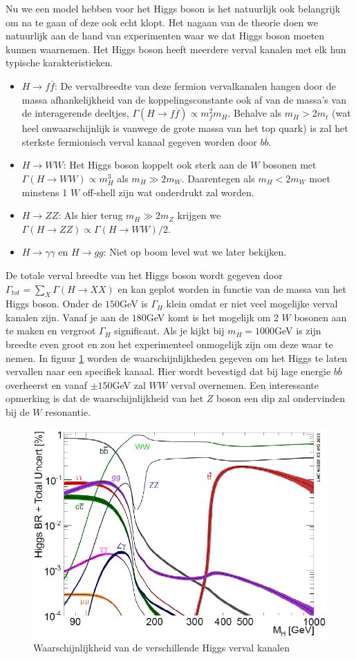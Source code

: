\documentclass[../main.tex]{subfiles}
\begin{document}
Nu we een model hebben voor het Higgs boson is het natuurlijk ook belangrijk om na te gaan of deze ook echt klopt. Het nagaan van de theorie doen we natuurlijk aan de hand van experimenten waar we dat Higgs boson moeten kunnen waarnemen. Het Higgs boson heeft meerdere verval kanalen met elk hun typische karakteristieken.
\begin{itemize}
    \item $H\rightarrow f\overline f$: De vervalbreedte van deze fermion vervalkanalen hangen door de massa afhankelijkheid van de koppelingsconstante ook af van de massa's van de interagerende deeltjes, $\Gamma(H\rightarrow f\overline f) \propto m_f^2m_H$. Behalve als $m_H > 2m_t$ (wat heel onwaarschijnlijk is vanwege de grote massa van het top quark) is zal het sterkste fermionisch verval kanaal gegeven worden door $b\overline b$.
    \item $H\rightarrow WW$: Het Higgs boson koppelt ook sterk aan de $W$ bosonen met $\Gamma(H\rightarrow WW)\propto m_H^3$ als $m_H \gg 2m_W$. Daarentegen als $m_H < 2m_W$ moet minstens 1 $W$ off-shell zijn wat onderdrukt zal worden.
    \item $H\rightarrow ZZ$: Als hier terug $m_H \gg 2m_Z$ krijgen we $\Gamma(H\rightarrow ZZ)\propto \Gamma(H\rightarrow WW)/2$.
    \item $H\rightarrow \gamma\gamma$ en $H \rightarrow gg$: Niet op boom level wat we later bekijken.
\end{itemize}
De totale verval breedte van het Higgs boson wordt gegeven door $\Gamma_{tot} = \sum_X \Gamma(H\rightarrow XX)$ en kan geplot worden in functie van de massa van het Higgs boson. Onder de $150$GeV is $\Gamma_H$ klein omdat er niet veel mogelijke verval kanalen zijn. Vanaf je aan de $180$GeV komt is het mogelijk om 2 $W$ bosonen aan te maken en vergroot $\Gamma_H$  significant. Als je kijkt bij $m_H=1000$GeV is zijn breedte even groot en zou het experimenteel onmogelijk zijn om deze waar te nemen. In figuur \ref{fig:higgs_boson/verval_higgs} worden de waarschijnlijkheden gegeven om het Higgs te laten vervallen naar een specifiek kanaal. Hier wordt bevestigd dat bij lage energie $b\overline b$ overheerst en vanaf $\pm 150$GeV zal $WW$ verval overnemen. Een interessante opmerking is dat de waarschijnlijkheid van het $Z$ boson een dip zal ondervinden bij de $W$ resonantie.

\begin{figure}[h]
    \centering
    \includegraphics[width=0.6\linewidth]{higgs_boson/verval_higgs.png}
    \caption{Waarschijnlijkheid van de verschillende Higgs verval kanalen}%
    \label{fig:higgs_boson/verval_higgs}
\end{figure}
\end{document}
